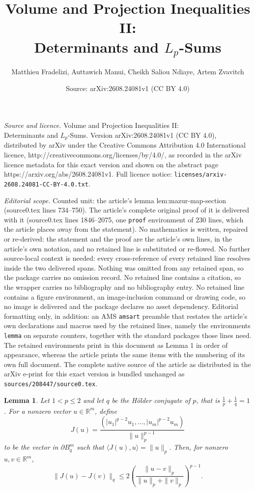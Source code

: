 \documentclass[10pt,a4paper]{amsart}
\title{Volume and Projection Inequalities II:\\ Determinants and $L_p$-Sums}
\author{Matthieu Fradelizi, Auttawich Manui, Cheikh Saliou Ndiaye, Artem Zvavitch}
\date{Source: arXiv:2608.24081v1 (CC BY 4.0)}
\newtheorem{lemma}{Lemma}
\newcommand{\R}{\mathbb R}
\begin{document}
\maketitle

\noindent\emph{Source and licence.} Volume and Projection Inequalities II:\\ Determinants and $L_p$-Sums. Version arXiv:2608.24081v1 (CC BY 4.0), distributed by arXiv under the Creative Commons Attribution 4.0 International licence, http://creativecommons.org/licenses/by/4.0/, as recorded in the arXiv licence metadata for this exact version and shown on the abstract page https://arxiv.org/abs/2608.24081v1. Full licence notice: \texttt{licenses/arxiv-2608.24081-CC-BY-4.0.txt}.\par\smallskip

\noindent\textit{Editorial scope.} Counted unit: the article's lemma lem:mazur-map-section (source0.tex lines 734--750). The article's complete original proof of it is delivered with it (source0.tex lines 1846--2075, one \texttt{proof} environment of 230 lines, which the article places away from the statement). No mathematics is written, repaired or re-derived: the statement and the proof are the article's own lines, in the article's own notation, and no retained line is substituted or re-flowed.  No further source-local context is needed: every cross-reference of every retained line resolves inside the two delivered spans.  Nothing was omitted from any retained span, so the package carries no omission record.  No retained line contains a citation, so the wrapper carries no bibliography and no bibliography entry.  No retained line contains a figure environment, an image-inclusion command or drawing code, so no image is delivered and the package declares no asset dependency.  Editorial formatting only, in addition: an AMS \texttt{amsart} preamble that restates the article's own declarations and macros used by the retained lines, namely the environments \texttt{lemma} on separate counters, together with the standard packages those lines need.  The retained environments print in this document as Lemma 1 in order of appearance, whereas the article prints the same items with the numbering of its own full document.  The complete native source of the article as distributed in the arXiv e-print for this exact version is bundled unchanged as \texttt{sources/208447/source0.tex}.
\begin{lemma}
\label{lem:mazur-map-section}
Let $1<p\leq2$ and let $q$ be  the H\"older conjugate of $p$, that is $\frac{1}{p} + \frac{1}{q} = 1$. For a nonzero vector $u\in\R^m$, define
\[
    J(u)=\frac{(|u_1|^{p-2}u_1,\ldots,|u_m|^{p-2}u_m)}{\|u\|_p^{p-1}}
\]
to be the vector in $\partial B_q^m$ such that $\langle J(u),u\rangle=\|u\|_p$.
Then, for nonzero $u,v\in\R^m$,
\begin{equation}
\label{eq:mazur-map-estimate-section}
    \|J(u)-J(v)\|_q
    \leq
    2\left(
       \frac{\|u-v\|_p}{\|u\|_p+\|v\|_p}
    \right)^{p-1}.
\end{equation}
\end{lemma}
\end{document}
